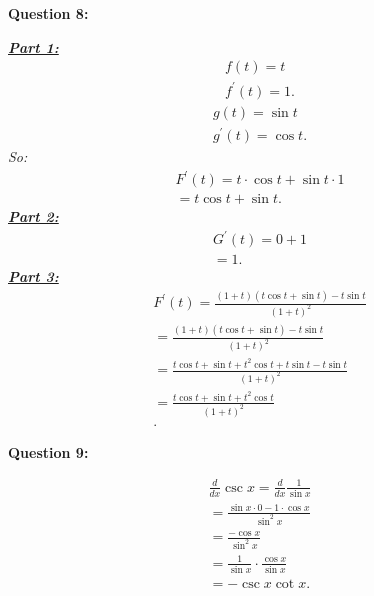 \documentclass{report}
\begin{document}
    \bigbreak \noindent \bigbreak \noindent 
    \begin{Large}
        \textbf{Question 8:}
    \end{Large}
    \bigbreak \noindent 
    \bigbreak \noindent 
    \textbf{\textit{\underline{Part 1:}}}
    \begin{align*}
        f(t) = t \\
        f^{\prime}(t) = 1
    .\end{align*}
    \begin{align*}
        g(t) = \sin{t} \\
        g^{\prime}(t) = \cos{t}
    .\end{align*}
    \bigbreak \noindent 
    \textit{So:}
    \begin{align*}
        F^{\prime}(t) = t \cdot \cos{t} + \sin{t} \cdot 1 \\
        = t\cos{t} + \sin{t}
    .\end{align*}
    \bigbreak \noindent 
    \textbf{\textit{\underline{Part 2:}}}
    \begin{align*}
        G^{\prime}(t) = 0 + 1 \\
        =1
    .\end{align*}
    \bigbreak \noindent 
    \textbf{\textit{\underline{Part 3:}}}
    \begin{align*}
        F^{\prime}(t) = \frac{(1+t)(t\cos{t}+\sin{t})-t\sin{t}}{(1+t)^2} \\
        = \frac{(1+t)(t\cos{t}+\sin{t})-t\sin{t}}{(1+t)^2} \\
        = \frac{t\cos{t}+\sin{t}+t^2\cos{t}+t\sin{t}-t\sin{t}}{(1+t)^2} \\
        = \frac{t\cos{t}+\sin{t}+t^2\cos{t}}{(1+t)^2} \\
    .\end{align*}

    \bigbreak \noindent \bigbreak \noindent 
    \begin{Large}
        \textbf{Question 9:}
    \end{Large}
    \bigbreak \noindent 
    \bigbreak \noindent 
    \begin{align*}
        \frac{d}{dx}\csc{x} = \frac{d}{dx}\frac{1}{\sin{x}} \\
        = \frac{\sin{x} \cdot 0 - 1 \cdot \cos{x}}{\sin^{2}{x}} \\
        = \frac{-\cos{x}}{\sin^{2}{x}} \\
        = \frac{1}{\sin{x}} \cdot \frac{\cos{x}}{\sin{x}} \\
        = -\csc{x}\cot{x}
    .\end{align*}
\end{document}
